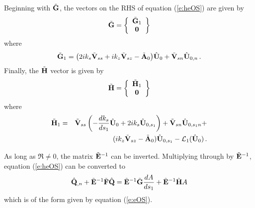 Beginning with $\tilde{{\bf G}}$, the vectors on the RHS of equation (\ref{e:heOS})
are given by
%
\begin{equation}
  \tilde{{\bf G}} = \left\{ \begin{array}{c} 
                     \tilde{{\bf G}}_{1} \\
                     {\bf 0}
                   \end{array}
            \right\} 
\end{equation}
%
where
%
\begin{equation}
  \tilde{{\bf G}}_{1} = \bigl(2 i k_s {\tilde {\bf V}}_{ss} + 
                  i k_z {\tilde {\bf V}}_{sz} - \tilde{{\bf A}}_0 \bigr) {\hat{\bf U}}_0 + 
                  {\tilde {\bf V}}_{sn} {\hat{\bf U}}_{0,n} {\, .}
\end{equation}
%
Finally, the $\tilde{{\bf H}}$ vector is given by
%
\begin{equation}
  \tilde{{\bf H}} = \left\{ \begin{array}{c} 
                     \tilde{{\bf H}}_{1} \\
                     {\bf 0}
                   \end{array}
            \right\}
\end{equation}
%
where
%
\begin{eqnarray}
  \tilde{{\bf H}}_{1} &=& {\tilde {\bf V}}_{ss}\left( - \frac{dk_s}{ds_1} {\hat{\bf U}}_0 + 
                    2 i k_s {\hat{\bf U}}_{0,s_1} \right) + 
                    {\tilde {\bf V}}_{sn} {\hat{\bf U}}_{0,s_1 n} + 
  \nonumber\\
                & & (i k_z {\tilde {\bf V}}_{sz} - 
                    \tilde{{\bf A}}_0) {\hat{\bf U}}_{0,s_1} - {\cal L}_1({\hat{\bf U}}_0) {\, .}
\end{eqnarray}

As long as $\Re \ne 0$, the matrix $\tilde{{\bf E}}^{-1}$ can be inverted.
Multiplying through by $\tilde{{\bf E}}^{-1}$, equation (\ref{e:heOS}) can be
converted to
%
\begin{equation}
  {\hat{\bf Q}}_{,n} + \tilde{{\bf E}}^{-1} \tilde{{\bf F}} {\hat{\bf Q}} = \tilde{{\bf E}}^{-1} \tilde{{\bf G}} 
  \frac{dA}{ds_1} + \tilde{{\bf E}}^{-1}\tilde{{\bf H}} A
\end{equation}
%
which is of the form given by equation (\ref{e:eOS}).
